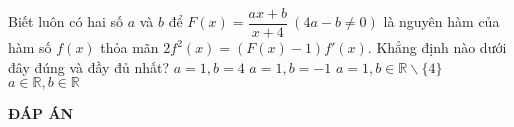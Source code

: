 \begin{ex}%
Biết luôn có hai số $a$ và $b$ để $F(x)=\dfrac{ax+b}{x+4}\ (4a-b \neq 0)$ là nguyên hàm của hàm số $f(x)$ thỏa mãn $2f^2(x)=\left (F(x)-1\right )f'(x)$. Khẳng định nào dưới đây đúng và đầy đủ nhất?
\choice
{$a=1,b=4$}
{$a=1,b=-1$}
{\True $a=1,b \in \mathbb{R} \backslash\{4\}$}
{$a \in \mathbb{R}, b \in \mathbb{R}$}
\end{ex}

\newpage
\begin{center}
\textbf{ĐÁP ÁN}
\end{center}
\begin{multicols}{10}

\end{multicols}
